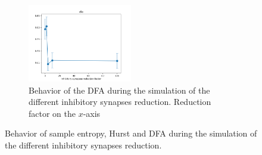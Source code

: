 \begin{figure}
\begin{subfigure}[t]{0.48\textwidth}
  \end{subfigure}
  \begin{subfigure}[t]{\textwidth}
    \centering
    \includegraphics[width=0.5\textwidth]{dfa_evolution}
    \caption{Behavior of the DFA during the simulation of the different inhibitory synapses reduction. Reduction factor on the $x$-axis}
    \label{fig:dfa-evolution}
  \end{subfigure}
  \caption{Behavior of sample entropy, Hurst and DFA during the simulation of the different inhibitory synapses reduction.}
  \label{fig:feature-distribution-behavior-2}
\end{figure}

